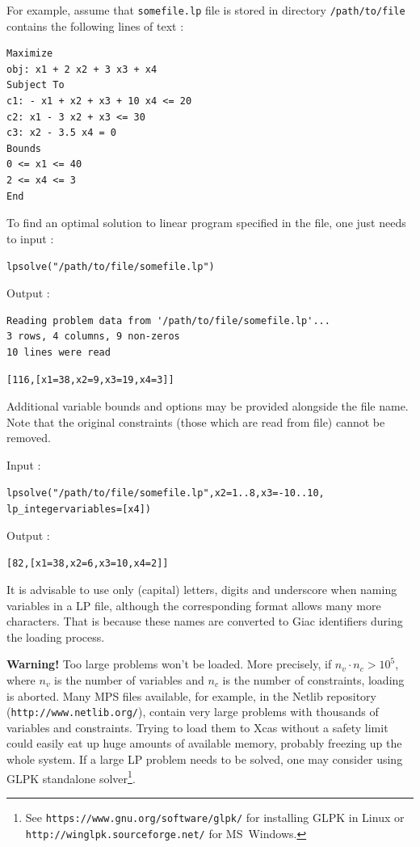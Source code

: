 \documentclass[a4paper,11pt]{book}
\begin{document}
For example, assume that {\tt somefile.lp} file is stored in directory {\tt /path/to/file} contains the following lines of text :
\begin{verbatim}
Maximize
obj: x1 + 2 x2 + 3 x3 + x4
Subject To
c1: - x1 + x2 + x3 + 10 x4 <= 20
c2: x1 - 3 x2 + x3 <= 30
c3: x2 - 3.5 x4 = 0
Bounds
0 <= x1 <= 40
2 <= x4 <= 3
End
\end{verbatim}
To find an optimal solution to linear program specified in the file, one just needs to input :
\begin{center}
	\tt lpsolve("/path/to/file/somefile.lp")
\end{center}
Output :
\begin{verbatim}
Reading problem data from '/path/to/file/somefile.lp'...
3 rows, 4 columns, 9 non-zeros
10 lines were read
\end{verbatim}
\begin{center}
	\tt [116,[x1=38,x2=9,x3=19,x4=3]]
\end{center}

Additional variable bounds and options may be provided alongside the file name. Note that the original constraints (those which are read from file) cannot be removed.

\noindent Input :
\begin{center}
	\tt lpsolve("/path/to/file/somefile.lp",x2=1..8,x3=-10..10,\\
	lp\_integervariables=[x4])
\end{center}
Output :
\begin{center}
	\tt [82,[x1=38,x2=6,x3=10,x4=2]]
\end{center}

It is advisable to use only (capital) letters, digits and underscore when naming variables in a LP file, although the corresponding format allows many more characters. That is because these names are converted to Giac identifiers during the loading process.

\textbf{Warning!} Too large problems won't be loaded. More precisely, if $ n_v\cdot n_c>10^5 $, where $ n_v $ is the number of variables and $ n_c $ is the number of constraints, loading is aborted. Many MPS files available, for example, in the Netlib repository ({\tt http://www.netlib.org/}), contain very large problems with thousands of variables and constraints. Trying to load them to Xcas without a safety limit could easily eat up huge amounts of available memory, probably freezing up the whole system. If a large LP problem needs to be solved, one may consider using GLPK standalone solver\footnote{See {\tt https://www.gnu.org/software/glpk/} for installing GLPK in Linux or {\tt http://winglpk.sourceforge.net/} for MS~Windows.}.
\end{document}
